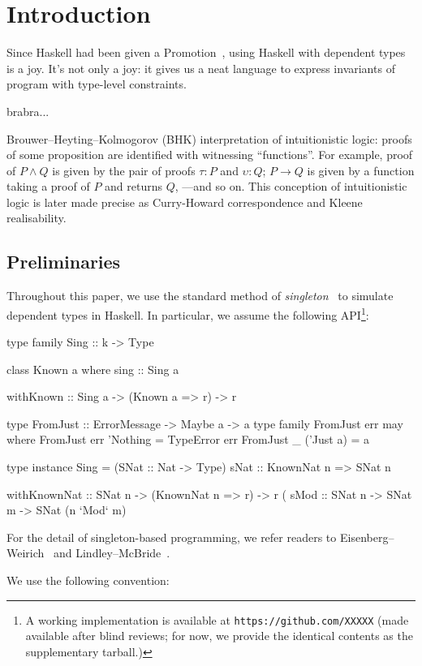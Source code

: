 \documentclass[demotion-paper.tex]{subfiles}
\begin{document}
\section{Introduction}
Since Haskell had been given a Promotion~\cite{Yorgey:2012}, using Haskell with dependent types is a joy.
It's not only a joy: it gives us a neat language to express invariants of program with type-level constraints.

brabra...

Brouwer--Heyting--Kolmogorov (BHK) interpretation of intuitionistic logic: proofs of some proposition are identified with witnessing ``functions''.
For example, proof of $P \land Q$ is given by the pair of proofs $\tau: P$ and $\upsilon: Q$; $P \to Q$ is given by a function taking a proof of $P$ and returns $Q$, ---and so on.
This conception of intuitionistic logic is later made precise as Curry-Howard correspondence and Kleene realisability.

\subsection{Preliminaries}
Throughout this paper, we use the standard method of \emph{singleton}~\cite{Eisenberg:2012} to simulate dependent types in Haskell.
In particular, we assume the following API\footnote{A working implementation is available at \texttt{https://github.com/XXXXX} (made available after blind reviews; for now, we provide the identical contents as the supplementary tarball.)}:

\begin{code}
type family Sing :: k -> Type

class Known a where
  sing :: Sing a

withKnown :: Sing a -> (Known a => r) -> r

type FromJust :: ErrorMessage -> Maybe a -> a
type family FromJust err may where 
  FromJust err 'Nothing = TypeError err
  FromJust _ ('Just a)  = a

type instance Sing = (SNat :: Nat -> Type)
sNat :: KnownNat n => SNat n

withKnownNat :: SNat n -> (KnownNat n => r) -> r
(%
sMod :: SNat n -> SNat m -> SNat (n `Mod` m)
\end{code}

For the detail of singleton-based programming, we refer readers to Eisenberg--Weirich~\cite{Eisenberg:2012} and Lindley--McBride~\cite{10.1145/2503778.2503786}.

We use the following convention:
\end{document}

